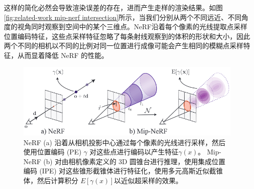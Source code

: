 这样的简化必然会导致渲染误差的存在，进而产生走样的渲染结果。如图\ref{fig:related-work mip-nerf intersection}所示，当我们分别从两个不同远近、不同角度的视角同时观察到空间中的某个三维点。NeRF沿着每个像素的光线提取点采样位置编码特征，这些点采样特征忽略了每条射线观察到的体积的形状和大小，因此两个不同的相机以不同的比例对同一位置进行成像可能会产生相同的模糊点采样特征，从而显着降低 NeRF 的性能。

\begin{figure}[h]
    \centering
    \includegraphics[width=\textwidth]{undergraduate-thesis/images/related-work/mipnerf-cone.png}
    \caption{NeRF (a) 沿着从相机投影中心通过每个像素的光线进行采样，然后使用位置编码 (PE) $\gamma$ 对这些点进行编码以产生特征$\gamma(x)$。 Mip-NeRF (b) 对由相机像素定义的 3D 圆锥台进行推理，使用集成位置编码 (IPE) 对这些锥形截锥体进行特征化，使用多元高斯近似截锥体，然后计算积分 $E[\gamma(x)]$以近似超采样的效果。}
    \label{fig:related-work mip-nerf cone tracing}
\end{figure}

